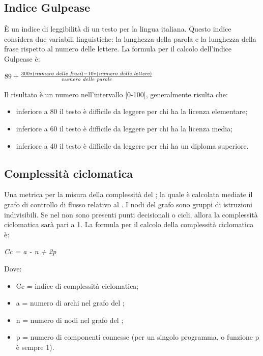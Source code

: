   \subsection{Indice Gulpease}
  È un indice di leggibilità di un testo per la lingua italiana.
  Questo indice considera due variabili linguistiche: la lunghezza della parola e la lunghezza della frase rispetto al numero delle lettere.
  La formula per il calcolo dell'indice Gulpease è:
  \begin{center}
    \( 89+\frac{300 * (\emph{numero delle frasi}) - 10 * (\emph{numero delle lettere})}{\emph{numero delle parole}} \)
  \end{center}
  Il risultato è un numero nell'intervallo [0-100], generalmente risulta che:
  \begin{itemize}
    \item inferiore a 80 il testo è difficile da leggere per chi ha la licenza elementare;
    \item inferiore a 60 il testo è difficile da leggere per chi ha la licenza media;
    \item inferiore a 40 il testo è difficile da leggere per chi ha un diploma superiore.
  \end{itemize}

  \subsection{Complessità ciclomatica}
  Una metrica per la misura della complessità del ;
  la quale è calcolata mediate il grafo di controllo di flusso relativo al .
  I nodi del grafo sono gruppi di istruzioni indivisibili. Se nel  non sono
  presenti punti decisionali o cicli, allora la complessità ciclomatica sarà pari a 1. La formula per il
  calcolo della complessità ciclomatica è:
  \begin{center}
    \emph{Cc = a - n + 2p}
  \end{center}
  Dove:
  \begin{itemize}
    \item Cc = indice di complessità ciclomatica;
    \item a = numero di archi nel grafo del ;
    \item n = numero di nodi nel grafo del ;
    \item p = numero di componenti connesse (per un singolo programma,  o funzione p è sempre 1).
  \end{itemize}

